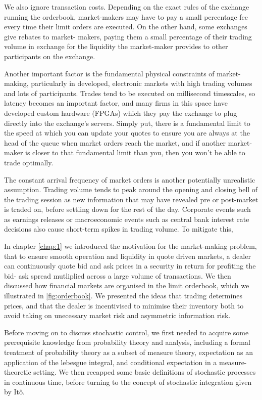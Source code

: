 We also ignore transaction costs. Depending on the exact rules of the exchange running 
the orderbook, market-makers may have to pay a small percentage fee every time their 
limit orders are executed. On the other hand, some exchanges give rebates to market-
makers, paying them a small percentage of their trading volume in exchange for the 
liquidity the market-maker provides to other participants on the exchange.

Another important factor is the fundamental physical constraints of market-making,
particularly in developed, electronic markets with high trading volumes and lots of
participants. Trades tend to be executed on millisecond timescales, so latency becomes
an important factor, and many firms in this space have developed custom hardware (FPGAs)
which they pay the exchange to plug directly into the exchange's servers. Simply put,
there is a fundamental limit to the speed at which you can update your quotes to ensure 
you are always at the head of the queue when market orders reach the market, and if 
another market-maker is closer to that fundamental limit than you, then you won't be 
able to trade optimally. 

The constant arrival frequency of market orders is another potentially unrealistic 
assumption. Trading volume tends to peak around the opening and closing bell of the 
trading session as new information that may have revealed pre or post-market is traded
on, before settling down for the rest of the day. Corporate events such as earnings 
releases or macroeconomic events such as central bank interest rate decisions also 
cause short-term spikes in trading volume. To mitigate this,


In chapter \ref{chap:1} we introduced the motivation for the market-making problem,
that to ensure smooth operation and liquidity in quote driven markets, a dealer can 
continuously quote bid and ask prices in a security in return for profiting the bid-
ask spread mutliplied across a large volume of transactions. We then discussed how 
financial markets are organised in the limit orderbook, which we illustrated in 
\ref{fig:orderbook}. We presented the ideas that trading determines prices, and that 
the dealer is incentivised to minimise their inventory both to avoid taking on 
unecessary market risk and asymmetric information risk.

Before moving on to discuss stochastic control, we first needed to acquire some 
prerequisite knowledge from probability theory and analysis, including a formal 
treatment of probability theory as a subset of measure theory, expectation as an
application of the lebesgue integral, and conditional expectation in a measure-theoretic
setting. We then recapped some basic definitions of stochastic processes in continuous
time, before turning to the concept of stochastic integration given by It\^{o}.

